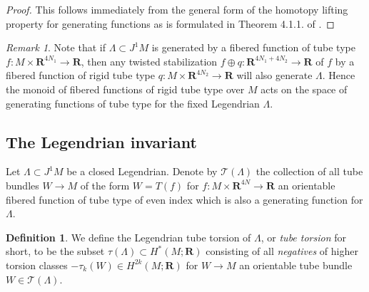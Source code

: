 \documentclass{amsart}
\newcommand\cT{\mathcal{T}}
\def\bR{\mathbf{R}}
\theoremstyle{definition}
\newtheorem{definition}[theorem]{Definition}
\theoremstyle{remark}
\newtheorem{inductive lemma}[theorem]{Inductive Lemma}
\newtheorem{remark}[theorem]{Remark}
\begin{document}
\begin{proof} This follows immediately from the general form of the homotopy lifting property for generating functions as is formulated in Theorem 4.1.1. of \cite{EG98}. \end{proof} 

\begin{remark}\label{rem: monoid act} Note that if $\Lambda \subset J^1M$ is generated by a fibered function of tube type $f:M \times \bR^{4N_1} \to \bR$, then any twisted stabilization $f \oplus q : \bR^{4N_1+4N_2} \to \bR$ of $f$ by a fibered function of rigid tube type $q:M \times \bR^{4N_2} \to \bR$ will also generate $\Lambda$. Hence the monoid of fibered functions of rigid tube type over $M$ acts on the space of generating functions of tube type for the fixed Legendrian $\Lambda$.  \end{remark}



\subsection{The Legendrian invariant}

Let $\Lambda \subset J^1M$ be a closed Legendrian. Denote by $\cT(\Lambda)$ the collection of all tube bundles $W \to M$ of the form $W=T(f)$ for $f:M \times \bR^{4N} \to \bR$ an orientable fibered function of tube type of even index which is also a generating function for $\Lambda$.


\begin{definition}\label{def: tube torsion}
We define the Legendrian tube torsion of $\Lambda$, or {\em tube torsion} for short, to be the subset $\tau(\Lambda)\subset H^*(M;\bR)$ consisting of all {\em negatives} of higher torsion classes $-\tau_k(W) \in H^{2k}(M;\bR)$ for $W \to M$ an orientable tube bundle  $W\in  \cT(\Lambda)$. 
\end{definition}

\end{document}
